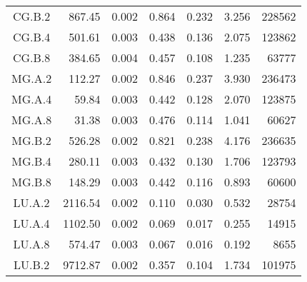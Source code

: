 \documentclass[../Main/thesis.tex]{subfiles}
\begin{document}
\begin{longtable}[c]{c*{6}{r}}
  CG.B.2                       & 867.45                       & 0.002                        & 0.864                      & 0.232                        & 3.256 & 228562 \\
  CG.B.4                       & 501.61                       & 0.003                        & 0.438                      & 0.136                        & 2.075 & 123862 \\
  CG.B.8                       & 384.65                       & 0.004                        & 0.457                      & 0.108                        & 1.235 & 63777  \\
  MG.A.2                       & 112.27                       & 0.002                        & 0.846                      & 0.237                        & 3.930 & 236473 \\
  MG.A.4                       & 59.84                        & 0.003                        & 0.442                      & 0.128                        & 2.070 & 123875 \\
  MG.A.8                       & 31.38                        & 0.003                        & 0.476                      & 0.114                        & 1.041 & 60627  \\
  MG.B.2                       & 526.28                       & 0.002                        & 0.821                      & 0.238                        & 4.176 & 236635 \\
  MG.B.4                       & 280.11                       & 0.003                        & 0.432                      & 0.130                        & 1.706 & 123793 \\
  MG.B.8                       & 148.29                       & 0.003                        & 0.442                      & 0.116                        & 0.893 & 60600  \\
  LU.A.2                       & 2116.54                      & 0.002                        & 0.110                      & 0.030                        & 0.532 & 28754  \\
  LU.A.4                       & 1102.50                      & 0.002                        & 0.069                      & 0.017                        & 0.255 & 14915  \\
  LU.A.8                       & 574.47                       & 0.003                        & 0.067                      & 0.016                        & 0.192 & 8655   \\
  LU.B.2                       & 9712.87                      & 0.002                        & 0.357                      & 0.104                        & 1.734 & 101975 \\

\end{longtable}
\end{document}
